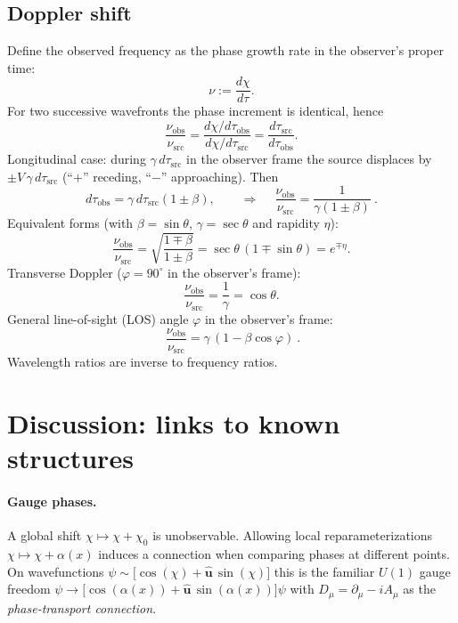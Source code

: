 \documentclass[11pt]{article}
\numberwithin{equation}{section}
\providecommand{\uhat}{\hat{\mathbf u}}
\begin{document}
\subsection{Doppler shift}
Define the observed frequency as the phase growth rate in the observer's proper time:
\begin{equation}
\nu:=\frac{d\chi}{d\tau}.
\label{eq:381}
\end{equation}
For two successive wavefronts the phase increment is identical, hence
\begin{equation}
\frac{\nu_{\mathrm{obs}}}{\nu_{\mathrm{src}}}
=\frac{d\chi/d\tau_{\mathrm{obs}}}{d\chi/d\tau_{\mathrm{src}}}
=\frac{d\tau_{\mathrm{src}}}{d\tau_{\mathrm{obs}}}.
\label{eq:382}
\end{equation}
Longitudinal case: during $\gamma\,d\tau_{\mathrm{src}}$ in the observer frame the source displaces by $\pm V\,\gamma\,d\tau_{\mathrm{src}}$ (``$+$'' receding, ``$-$'' approaching). Then
\begin{equation}
d\tau_{\mathrm{obs}}=\gamma\,d\tau_{\mathrm{src}}(1\pm\beta),\qquad
\Rightarrow\quad
\boxed{\ \frac{\nu_{\mathrm{obs}}}{\nu_{\mathrm{src}}}=\frac{1}{\gamma(1\pm\beta)}\ }.
\label{eq:384}
\end{equation}
Equivalent forms (with $\beta=\sin\theta$, $\gamma=\sec\theta$ and rapidity $\eta$):
\begin{equation}
\frac{\nu_{\mathrm{obs}}}{\nu_{\mathrm{src}}}
=\sqrt{\frac{1\mp\beta}{1\pm\beta}}
=\sec\theta\,(1\mp\sin\theta)
=e^{\mp\eta}.
\label{eq:385}
\end{equation}
Transverse Doppler ($\varphi=90^\circ$ in the observer's frame):
\begin{equation}
\frac{\nu_{\mathrm{obs}}}{\nu_{\mathrm{src}}}=\frac{1}{\gamma}=\cos\theta.
\label{eq:389}
\end{equation}
General line-of-sight (LOS) angle $\varphi$ in the observer's frame:
\begin{equation}
\boxed{\ \frac{\nu_{\mathrm{obs}}}{\nu_{\mathrm{src}}}=\gamma\,(1-\beta\cos\varphi)\ }.
\label{eq:3810}
\end{equation}
Wavelength ratios are inverse to frequency ratios.

\section{Discussion: links to known structures}
\paragraph{Gauge phases.} A global shift $\chi\mapsto\chi+\chi_0$ is unobservable. Allowing local reparameterizations $\chi\mapsto\chi+\alpha(x)$ induces a connection when comparing phases at different points. On wavefunctions $\psi\sim \bigl[\cos(\chi)+\uhat\,\sin(\chi)\bigr]$ this is the familiar $U(1)$ gauge freedom $\psi\to \bigl[\cos(\alpha(x))+\uhat\,\sin(\alpha(x))\bigr]\psi$ with $D_\mu=\partial_\mu-iA_\mu$ as the \emph{phase-transport connection}.
\end{document}
